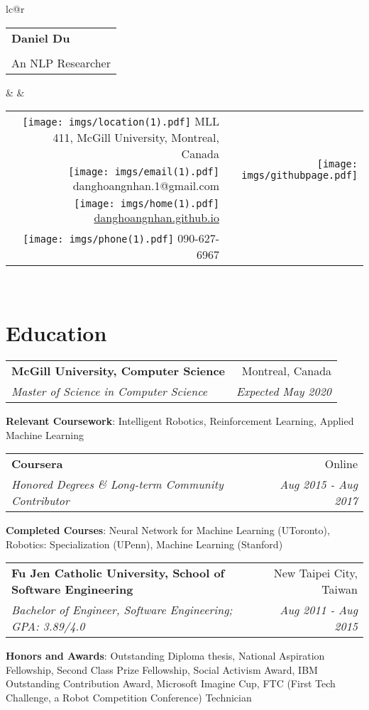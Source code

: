 \documentclass[letterpaper,10pt]{article}
\makeatletter
\newcommand{\resumeItemNoBullet}[2]{
  \item[]\small{
    \hspace{-9pt}\textbf{#1}{: #2 \vspace{-6pt}}
  }
}
\newcommand{\resumeSubheading}[4]{
  \vspace{-1pt}\item[]
  \begin{tabular*}{0.98\textwidth}{l@{\extracolsep{\fill}}r}
      \hspace{-10pt}\textbf{#1} & #2 \\
      \hspace{-10pt}\textit{\small#3} & \textit{\small #4} \\
    \end{tabular*}\vspace{-5pt}
}
\newcommand{\resumeSubHeadingListStart}{\begin{itemize}[leftmargin=*]}
\newcommand{\resumeSubHeadingListEnd}{\end{itemize}}
\newcommand{\shorterSection}[1]{\vspace{-10pt}\section{#1}}
\makeatother
\begin{document}

\begin{table}[]
\begin{tabular*}{\textwidth}{lc@{\extracolsep{\fill}}r}
\begin{tabular}{l}
\textbf{\huge \textcolor{titleblue}{Daniel Du}} \\
\\
An NLP Researcher   
\end{tabular}  &  & \begin{tabular}{@{}rr@{}} \textcolor{titleblue}{\texttt{[image: imgs/location(1).pdf]}} MLL 411, McGill University, Montreal, Canada & \multirow{3}{*}{\texttt{[image: imgs/githubpage.pdf]}} \\
\texttt{[image: imgs/email(1).pdf]} danghoangnhan.1@gmail.com                     &                   \\
\texttt{[image: imgs/home(1).pdf]} \href{http://danghoangnhan.github.io}{danghoangnhan.github.io}                            &                   \\
\texttt{[image: imgs/phone(1).pdf]} 090-627-6967                                  &                   
\end{tabular}  \\ 
\end{tabular*}
\end{table}

\vspace*{-10mm}


\shorterSection{\textcolor{titleblue}{Education}}
  \resumeSubHeadingListStart
    \resumeSubheading
      {McGill University, Computer Science}{Montreal, Canada}     {Master of Science in Computer Science}{Expected May 2020}{
      \resumeItemNoBullet{Relevant Coursework}{Intelligent Robotics, Reinforcement Learning, Applied Machine Learning}
    }
    \resumeSubheading
      {Coursera}{Online}     {Honored Degrees \& Long-term Community Contributor}{Aug 2015 - Aug 2017}{
      \resumeItemNoBullet{Completed Courses}{Neural Network for Machine Learning (UToronto), Robotics: Specialization (UPenn), Machine Learning (Stanford)}
    }
    \resumeSubheading
      {Fu Jen Catholic University, School of Software Engineering}{New Taipei City, Taiwan}     {Bachelor of Engineer, Software Engineering;  GPA: 3.89/4.0}{Aug 2011 - Aug 2015}{
      \resumeItemNoBullet{Honors and Awards}{Outstanding Diploma thesis, National Aspiration Fellowship, Second Class Prize Fellowship, Social Activism Award, IBM
Outstanding Contribution Award, Microsoft Imagine Cup, FTC (First Tech Challenge, a Robot Competition Conference) Technician}
    }
  \resumeSubHeadingListEnd
\end{document}
